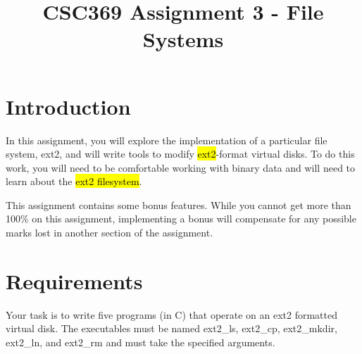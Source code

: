 \documentclass[12pt]{article}
\begin{document}
\title{CSC369 Assignment 3 - File Systems}
\maketitle

\bigskip

\section{Introduction}

\bigskip

\noindent In this assignment, you will explore the implementation of a particular file
system, ext2, and will write tools to modify \hl{ext2}-format virtual disks. To do
this work, you will need to be comfortable working with binary data and will
need to learn about the \hl{ext2 filesystem}.

\bigskip

\noindent This assignment contains some bonus features. While you cannot get more than
100\% on this assignment, implementing a bonus will compensate for any possible
marks lost in another section of the assignment.

\bigskip

\section{Requirements}

\bigskip

Your task is to write five programs (in C) that operate on an ext2 formatted
virtual disk. The executables must be named ext2\_ls, ext2\_cp, ext2\_mkdir, ext2\_ln,
and ext2\_rm and must take the specified arguments.

\bigskip
\end{document}
